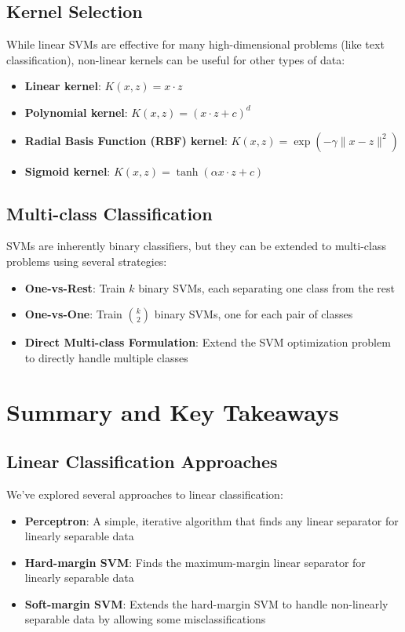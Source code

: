 \documentclass{article}
\begin{document}
\subsection{Kernel Selection}
While linear SVMs are effective for many high-dimensional problems (like text classification), non-linear kernels can be useful for other types of data:

\begin{itemize}
    \item \textbf{Linear kernel}: $K(x, z) = x \cdot z$
    \item \textbf{Polynomial kernel}: $K(x, z) = (x \cdot z + c)^d$
    \item \textbf{Radial Basis Function (RBF) kernel}: $K(x, z) = \exp(-\gamma \|x - z\|^2)$
    \item \textbf{Sigmoid kernel}: $K(x, z) = \tanh(\alpha x \cdot z + c)$
\end{itemize}

\subsection{Multi-class Classification}
SVMs are inherently binary classifiers, but they can be extended to multi-class problems using several strategies:

\begin{itemize}
    \item \textbf{One-vs-Rest}: Train $k$ binary SVMs, each separating one class from the rest
    \item \textbf{One-vs-One}: Train $\binom{k}{2}$ binary SVMs, one for each pair of classes
    \item \textbf{Direct Multi-class Formulation}: Extend the SVM optimization problem to directly handle multiple classes
\end{itemize}

\section{Summary and Key Takeaways}

\subsection{Linear Classification Approaches}
We've explored several approaches to linear classification:

\begin{itemize}
    \item \textbf{Perceptron}: A simple, iterative algorithm that finds any linear separator for linearly separable data
    \item \textbf{Hard-margin SVM}: Finds the maximum-margin linear separator for linearly separable data
    \item \textbf{Soft-margin SVM}: Extends the hard-margin SVM to handle non-linearly separable data by allowing some misclassifications
\end{itemize}
\end{document}

